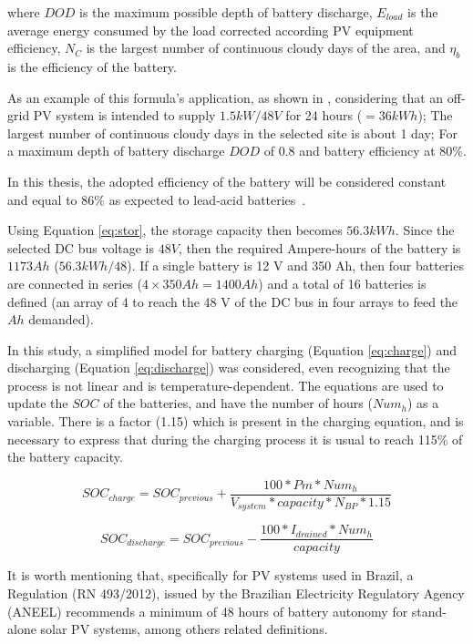 \noindent where $ DOD $ is the maximum possible depth of battery discharge, $ E_{load} $ is the average energy consumed by the load corrected according PV equipment efficiency, $ N_{C} $ is the largest number of continuous cloudy days of the area, and $ \eta_{b} $ is the efficiency of the battery.

As an example of this formula's application, as shown in \cite{Abdulateef}, considering that an off-grid PV system is intended to supply $1.5 kW/48 V$ for 24 hours ($=36 kWh$); The largest number of continuous cloudy days in the selected site is about 1 day; For a maximum depth of battery discharge $DOD$ of $0.8$ and battery efficiency at $80\%$. 

In this thesis, the adopted efficiency of the battery will be considered constant and equal to $86\%$ as expected to lead-acid batteries~\cite{Pinho}.

Using Equation \ref{eq:stor}, the storage capacity then becomes $56.3 kWh$. Since the selected DC bus voltage is $48 V$, then the required Ampere-hours of the battery is $1173 Ah$ ($56.3 kWh/48$). If a single battery is 12 V and 350 Ah, then four batteries are connected in series ($4 \times 350 Ah = 1400 Ah$) and a total of 16 batteries is defined (an array of 4 to reach the 48 V of the DC bus in four arrays to feed the $Ah$ demanded).

In this study, a simplified model for battery charging (Equation \ref{eq:charge}) and discharging (Equation \ref{eq:discharge}) was considered, even recognizing that the process is not linear and is temperature-dependent. The equations are used to update the $SOC$ of the batteries, and have the number of hours ($ Num_{h} $) as a variable. There is a factor (1.15) which is present in the charging equation, and is necessary to express that during the charging process it is usual to reach 115\% of the battery capacity.

\begin{equation}
\label{eq:charge}
SOC_{charge} = SOC_{previous} + \dfrac{100*Pm*Num_{h}}{V_{system}*capacity*N_{BP}*1.15}
\end{equation}

\begin{equation}
\label{eq:discharge}
SOC_{discharge} = SOC_{previous} - \dfrac{100*I_{drained}*Num_{h}}{capacity}
\end{equation}

It is worth mentioning that, specifically for PV systems used in Brazil, a Regulation (RN 493/2012), issued by the Brazilian Electricity Regulatory Agency (ANEEL) recommends a minimum of 48 hours of battery autonomy for stand-alone solar PV systems, among others related definitions.

